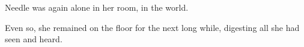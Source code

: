 Needle was again alone in her room, in the world. 

Even so, she remained on the floor for the next long while, digesting all she had seen and heard. 






